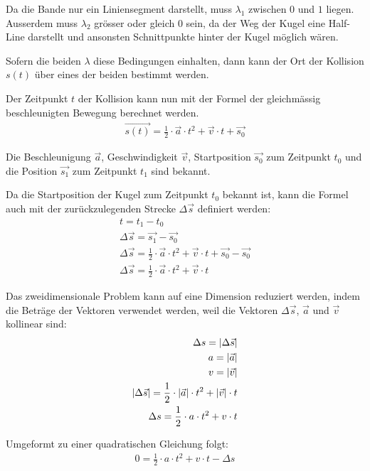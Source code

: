 Da die Bande nur ein Liniensegment darstellt, muss $\lambda_1$ zwischen $0$ und $1$ liegen.
Ausserdem muss $\lambda_2$ grösser oder gleich $0$ sein, da der Weg der Kugel eine Half-Line darstellt und ansonsten
Schnittpunkte hinter der Kugel möglich wären.

Sofern die beiden $\lambda$ diese Bedingungen einhalten, dann kann der Ort der Kollision $s(t)$ über eines der beiden bestimmt werden.

Der Zeitpunkt $t$ der Kollision kann nun mit der Formel der gleichmässig beschleunigten Bewegung berechnet werden.
\begin{align}
    \vec{s(t)} = \frac{1}{2} \cdot \vec{a} \cdot t^2 + \vec{v} \cdot t + \vec{s_0}
\end{align}

Die Beschleunigung $\vec{a}$, Geschwindigkeit $\vec{v}$, Startposition $\vec{s_0}$ zum Zeitpunkt $t_0$
und die Position $\vec{s_1}$ zum Zeitpunkt $t_1$ sind bekannt.

Da die Startposition der Kugel zum Zeitpunkt $t_0$ bekannt ist,
kann die Formel auch mit der zurückzulegenden Strecke $\Delta \vec{s}$ definiert werden:
\begin{align}
    t = t_1 - t_0\\
    \Delta \vec{s} = \vec{s_1} - \vec{s_0}\\
    \Delta \vec{s} = \frac{1}{2} \cdot \vec{a} \cdot t^2 + \vec{v} \cdot t + \vec{s_0} - \vec{s_0}\\
    \Delta \vec{s} = \frac{1}{2} \cdot \vec{a} \cdot t^2 + \vec{v} \cdot t
\end{align}

Das zweidimensionale Problem kann auf eine Dimension reduziert werden, indem die Beträge der Vektoren verwendet werden,
weil die Vektoren $\Delta \vec{s}$, $\vec{a}$ und $\vec{v}$ kollinear sind:
\begin{align}
    \Delta s = \lvert \Delta \vec{s} \rvert\\
    a = \lvert \vec{a} \rvert\\
    v = \lvert \vec{v} \rvert\\
    \lvert \Delta \vec{s} \rvert = \frac{1}{2} \cdot \lvert \vec{a} \rvert \cdot t^2 + \lvert \vec{v} \rvert \cdot t\\
    \Delta s = \frac{1}{2} \cdot a \cdot t^2 + v \cdot t
\end{align}

Umgeformt zu einer quadratischen Gleichung folgt:
\begin{align}
    0 = \frac{1}{2} \cdot a \cdot t^2 + v \cdot t - \Delta s
\end{align}

